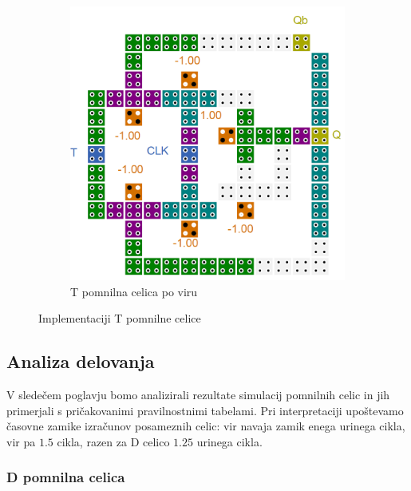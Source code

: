 \documentclass[a4paper, 11pt]{article}
\begin{document}
\begin{figure}[h!]
\begin{subfigure}[b]{0.4\textwidth}
	\includegraphics[width=\textwidth]{../img/vir_5/t.png} 
	\caption{T pomnilna celica po viru \cite{a_novel_approach}}
	\label{fig-t-2}
	\end{subfigure}
	\caption{Implementaciji T pomnilne celice}
	\label{fig-t}
\end{figure}


\subsection{Analiza delovanja}
V sledečem poglavju bomo analizirali rezultate simulacij pomnilnih celic in jih primerjali s pričakovanimi pravilnostnimi tabelami. Pri interpretaciji upoštevamo časovne zamike izračunov posameznih celic: vir \cite{quantum_dot} navaja zamik enega urinega cikla, vir \cite{a_novel_approach} pa $1.5$ cikla, razen za D celico $1.25$ urinega cikla.

\subsubsection{D pomnilna celica}
\end{document}
